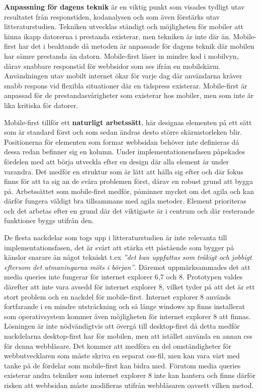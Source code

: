\documentclass[11pt]{article}
\begin{document}
\textbf{Anpassning för dagens teknik} är en viktig punkt som visades tydligt utav resultatet från responstiden, kodanalysen och som även förstärks utav litteraturstudien. Tekniken utvecklas ständigt och möjligheten för mobiler att hinna ikapp datorerna i prestanda existerar, men tekniken är inte där än. Mobile-first har det i beaktande då metoden är anpassade för dagens teknik där mobilen har sämre prestanda än datorn. Mobile-first läser in mindre kod i mobilvyn, därav snabbare responstid för webbsidor som ses ifrån en mobilskärm. Användningen utav mobilt internet ökar för varje dag där användarna kräver snabb respons vid flexibla situationer där en tidspress existerar. Mobile-first är anpassad för de prestandasvårigheter som existerar hos mobiler, men som inte är lika kritiska för datorer. 

Mobile-first tillför ett \textbf{naturligt arbetssätt}, här designas elementen på ett sätt som är standard först och som sedan ändras desto större skärmstorleken blir. Positionerna för elementen som formar webbsidan behöver inte definieras då dessa redan befinner sig en kolumn. Under implementationensfasen påpekades fördelen med att börja utveckla efter en design där alla element är under varandra. Det medför en struktur som är lätt att hålla sig efter och där fokus finns för att ta sig an de svåra problemen först, därav en robust grund att bygga på. Arbetssättet som mobile-first medför, påminner mycket om det agila och kan därför fungera väldigt bra tillsammans med agila metoder. Element prioriteras och det arbetas efter en grund där det viktigaste är i centrum och där resterande funktioner byggs utifrån den.

De flesta nackdelar som togs upp i litteraturstudien är inte relevanta till implementationsfasen, det är svårt att stärka ett påstående som bygger på känslor snarare än något tekniskt t.ex \textit{”det kan uppfattas som tråkigt och jobbigt eftersom det utmaningarna möts i början”}. Däremot uppmärksammades det att media queries inte fungerar för internet explorer 6,7 och 8. Prototypen valdes därefter att inte vara avsedd för internet explorer 8, vilket tyder på att det är ett stort problem och en nackdel för mobile-first. Internet explorer 8 används fortfarande i en mindre utsträckning och så länge windows xp finns installerat som operativsystem kommer även möjligheten för internet explorer 8 att finnas. Lösningen är inte nödvändigtvis att övergå till desktop-first då detta medför nackdelarna desktop-first har för mobilen, men att istället använda en annan css för denna webbläsare. Det kommer att medföra en del omständigheter för webbutvecklaren som måste skriva en separat css-fil, men kan vara värt med tanke på de fördelar som mobile-first kan bidra med. Förutom media queries existerar andra tekniker som internet explorer 8 inte kan hantera och finns därför risken att webbsidan måste modifieras utifrån webbläsaren oavsett vilken metod.
\end{document}
